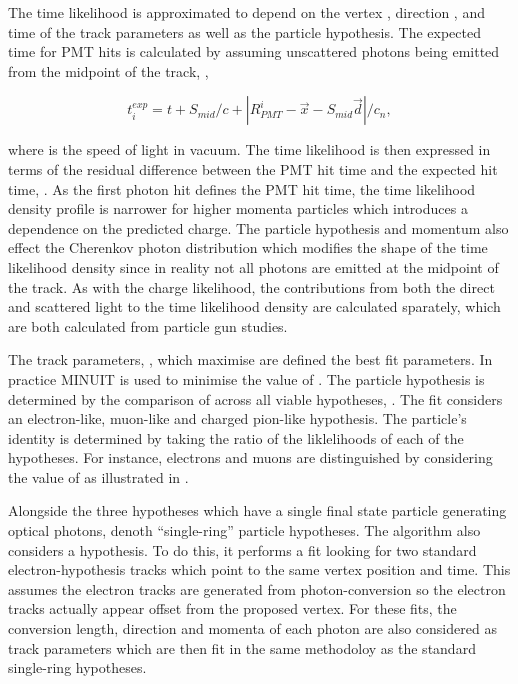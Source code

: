 The time likelihood is approximated to depend on the vertex , direction , and time  of the track parameters as well as the particle hypothesis. The expected time for PMT hits is calculated by assuming unscattered photons being emitted from the midpoint of the track, ,

\begin{equation}
  t^{exp}_{i} = t + S_{mid}/c + |R_{PMT}^{i} - \vec{x} - S_{mid}\vec{d}|/c_{n},
\end{equation}

where  is the speed of light in vacuum. The time likelihood is then expressed in terms of the residual difference between the PMT hit time and the expected hit time, . As the first photon hit defines the PMT hit time, the time likelihood density profile is narrower for higher momenta particles which introduces a dependence on the predicted charge. The particle hypothesis and momentum also effect the Cherenkov photon distribution which modifies the shape of the time likelihood density since in reality not all photons are emitted at the midpoint of the track. As with the charge likelihood, the contributions from both the direct and scattered light to the time likelihood density are calculated sparately, which are both calculated from particle gun studies.

The track parameters, \quickmath{\vec{\theta}}, which maximise  are defined the best fit parameters. In practice MINUIT  is used to minimise the value of . The particle hypothesis is determined by the comparison of   across all viable hypotheses, \quickmath{\Gamma}. The fit considers an electron-like, muon-like and charged pion-like hypothesis. The particle's identity is determined by taking the ratio of the liklelihoods of each of the hypotheses. For instance, electrons and muons are distinguished by considering the value of  as illustrated in . 

Alongside the three hypotheses which have a single final state particle generating optical photons, denoth ``single-ring'' particle hypotheses. The \fq algorithm also considers a  hypothesis. To do this, it performs a fit looking for two standard electron-hypothesis tracks which point to the same vertex position and time. This assumes the electron tracks are generated from photon-conversion so the electron tracks actually appear offset from the proposed  vertex. For these fits, the conversion length, direction and momenta of each photon are also considered as track parameters which are then fit in the same methodoloy as the standard single-ring hypotheses. 

